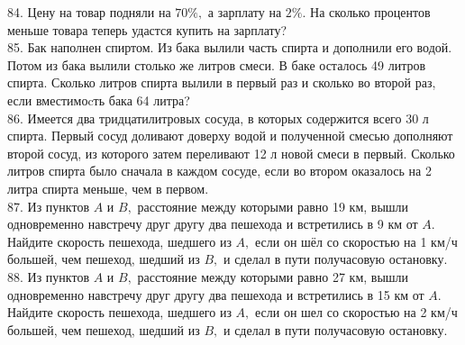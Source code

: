 84. Цену на товар подняли на $70\%,$ а зарплату на $2\%.$ На сколько процентов меньше товара теперь удастся купить на зарплату?\\
85. Бак наполнен спиртом. Из бака вылили часть спирта и
дополнили его водой. Потом из бака вылили столько же
литров смеси. В баке осталось 49 литров спирта. Сколько
литров спирта вылили в первый раз и сколько во второй
раз, если вместимоcть бака 64 литра?\\
86. Имеется два тридцатилитровых сосуда, в которых
содержится всего 30 л спирта. Первый сосуд доливают
доверху водой и полученной смесью дополняют второй
сосуд, из которого затем переливают 12 л новой смеси в
первый. Сколько литров спирта было сначала в каждом
сосуде, если во втором оказалось на 2 литра спирта
меньше, чем в первом.\\
87. Из пунктов $A$ и $B,$ расстояние между которыми равно 19
км, вышли одновременно навстречу друг другу два
пешехода и встретились в 9 км от $A.$ Найдите скорость
пешехода, шедшего из $A,$ если он шёл со скоростью на
1 км/ч большей, чем пешеход, шедший из $B,$ и сделал в
пути получасовую остановку.\\
88. Из пунктов $A$ и $B,$ расстояние между которыми равно 27
км, вышли одновременно навстречу друг другу два
пешехода и встретились в 15 км от $A.$ Найдите скорость
пешехода, шедшего из $A,$ если он шел со скоростью на
2 км/ч большей, чем пешеход, шедший из $B,$ и сделал в
пути получасовую остановку.
\newpage
